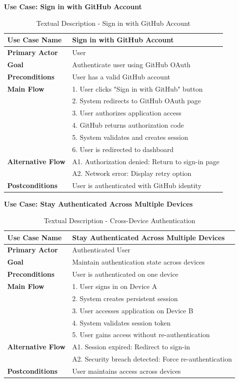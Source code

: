 \textbf{Use Case: Sign in with GitHub Account}
\begin{table}[H]
\centering
\caption{Textual Description - Sign in with GitHub Account}
\label{tab:github_signin_description}
\begin{tabular}{|p{3cm}|p{10cm}|}
\hline
\textbf{Use Case Name} & Sign in with GitHub Account \\
\hline
\textbf{Primary Actor} & User \\
\hline
\textbf{Goal} & Authenticate user using GitHub OAuth \\
\hline
\textbf{Preconditions} & User has a valid GitHub account \\
\hline
\textbf{Main Flow} & 
1. User clicks "Sign in with GitHub" button \\
& 2. System redirects to GitHub OAuth page \\
& 3. User authorizes application access \\
& 4. GitHub returns authorization code \\
& 5. System validates and creates session \\
& 6. User is redirected to dashboard \\
\hline
\textbf{Alternative Flow} & 
A1. Authorization denied: Return to sign-in page \\
& A2. Network error: Display retry option \\
\hline
\textbf{Postconditions} & User is authenticated with GitHub identity \\
\hline
\end{tabular}
\end{table}

\textbf{Use Case: Stay Authenticated Across Multiple Devices}
\begin{table}[H]
\centering
\caption{Textual Description - Cross-Device Authentication}
\label{tab:cross_device_auth_description}
\begin{tabular}{|p{3cm}|p{10cm}|}
\hline
\textbf{Use Case Name} & Stay Authenticated Across Multiple Devices \\
\hline
\textbf{Primary Actor} & Authenticated User \\
\hline
\textbf{Goal} & Maintain authentication state across devices \\
\hline
\textbf{Preconditions} & User is authenticated on one device \\
\hline
\textbf{Main Flow} & 
1. User signs in on Device A \\
& 2. System creates persistent session \\
& 3. User accesses application on Device B \\
& 4. System validates session token \\
& 5. User gains access without re-authentication \\
\hline
\textbf{Alternative Flow} & 
A1. Session expired: Redirect to sign-in \\
& A2. Security breach detected: Force re-authentication \\
\hline
\textbf{Postconditions} & User maintains access across devices \\
\hline
\end{tabular}
\end{table}

